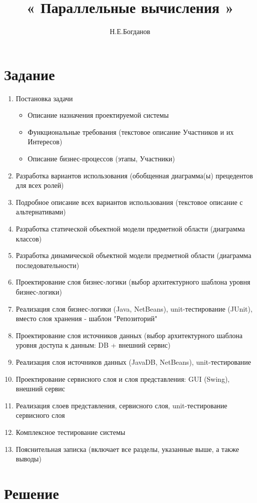\documentclass[12pt,a4paper,titlepage]{article}
\author{Н.Е.Богданов}
\title{ « Параллельные вычисления »}
\begin{document}
\maketitle
\tableofcontents
\newpage
\section{Задание}

\begin{enumerate}
\item 
Постановка задачи
\begin{itemize}
\item 
Описание назначения проектируемой системы
\item 
Функциональные требования (текстовое описание Участников и их Интересов)
\item
Описание бизнес-процессов (этапы, Участники)
\end{itemize} 
\item
Разработка вариантов использования (обобщенная диаграмма(ы) прецедентов для всех ролей)
\item
Подробное описание всех вариантов использования (текстовое описание с альтернативами)
\item
Разработка статической объектной модели предметной области (диаграмма классов)
\item
Разработка динамической объектной модели предметной области (диаграмма последовательности)
\item
Проектирование слоя бизнес-логики (выбор архитектурного шаблона уровня бизнес-логики)
\item
Реализация слоя бизнес-логики (Java, NetBeans), unit-тестирование (JUnit), вместо слоя хранения - шаблон "Репозиторий"
\item
Проектирование слоя источников данных (выбор архитектурного шаблона уровня доступа к данным: DB + внешний сервис)
\item
Реализация слоя источников данных (JavaDB, NetBeans), unit-тестирование
\item
Проектирование сервисного слоя и слоя представления: GUI (Swing), внешний сервис
\item
Реализация слоев представления, сервисного слоя, unit-тестирование сервисного слоя
\item
Комплексное тестирование системы
\item
Пояснительная записка (включает все разделы, указанные выше, а также выводы)
\end{enumerate}
\section{Решение}
\end{document}
